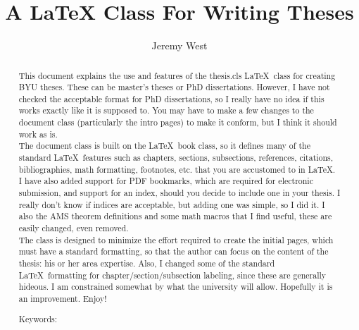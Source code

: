 \documentclass[12pt]{thesis}
\author{Jeremy West} %
\title{A LaTeX Class For Writing Theses}
\begin{document}
\setlength{\abovedisplayskip}{3pt}
\setlength{\belowdisplayskip}{3pt}

\frontmatter
\maketitle  %

\begin{abstract} %


This document explains the use and features of the thesis.cls \LaTeX\ class for creating BYU theses. These can be master's theses or PhD dissertations. However, I have not checked the acceptable format for PhD dissertations, so I really have no idea if this works exactly like it is supposed to. You may have to make a few changes to the document class (particularly the intro pages) to make it conform, but I think it should work as is.\\ %
	
The document class is built on the \LaTeX\ book class, so it defines many of the standard \LaTeX\ features such as chapters, sections, subsections, references, citations, bibliographies, math formatting, footnotes, etc. that you are accustomed to in \LaTeX. I have also added support for PDF bookmarks, which are required for electronic submission, and support for an index, should you decide to include one in your thesis. I really don't know if indices are acceptable, but adding one was simple, so I did it. I also the AMS theorem definitions and some math macros that I find useful, these are easily changed, even removed.\\
	
The class is designed to minimize the effort required to create the initial pages, which must have a standard formatting, so that the author can focus on the content of the thesis: his or her area expertise. Also, I changed some of the standard \LaTeX\ formatting for chapter/section/subsection labeling, since these are generally hideous. I am constrained somewhat by what the university will allow. Hopefully it is an improvement. Enjoy!
  \vskip 3.25in
 
\noindent Keywords: %
\end{abstract}
\end{document}
